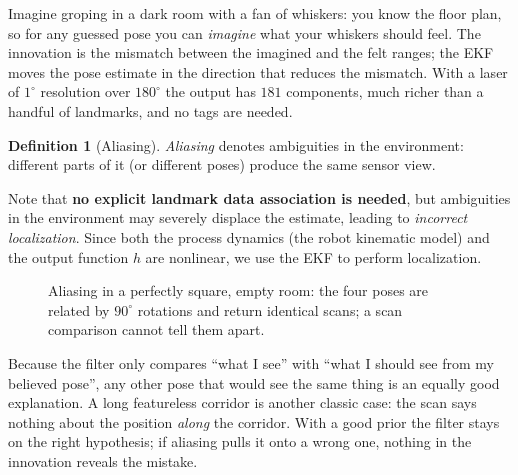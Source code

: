 \documentclass[11pt,a4paper]{article}
\def\bm#1{#1}%
\newcommand{\robot}[3][fill=white]{\begin{scope}[shift={(#2)},rotate=#3]\draw[#1,thick] (0.24,0)--(-0.16,0.15)--(-0.16,-0.15)--cycle;\end{scope}}
\theoremstyle{definition}
\newtheorem{definition}{Definition}[section]
\theoremstyle{plain}
\theoremstyle{remark}
\begin{document}
\begin{intuition}
Imagine groping in a dark room with a fan of whiskers: you know the floor plan, so for any guessed pose you can \emph{imagine} what your whiskers should feel. The innovation is the mismatch between the imagined and the felt ranges; the EKF moves the pose estimate in the direction that reduces the mismatch. With a laser of $1^\circ$ resolution over $180^\circ$ the output has $181$ components, much richer than a handful of landmarks, and no tags are needed.
\end{intuition}

\begin{definition}[Aliasing]
\emph{Aliasing} denotes ambiguities in the environment: different parts of it (or different poses) produce the same sensor view.
\end{definition}

Note that \textbf{no explicit landmark data association is needed}, but ambiguities in the environment may severely displace the estimate, leading to \emph{incorrect localization}. Since both the process dynamics (the robot kinematic model) and the output function $\bm h$ are nonlinear, we use the EKF to perform localization.

\begin{figure}[H]
\centering
{}
\caption{Aliasing in a perfectly square, empty room: the four poses are related by $90^\circ$ rotations and return identical scans; a scan comparison cannot tell them apart.}
\label{fig:aliasing}
\end{figure}

\begin{intuition}
Because the filter only compares ``what I see'' with ``what I should see from my believed pose'', any other pose that would see the same thing is an equally good explanation. A long featureless corridor is another classic case: the scan says nothing about the position \emph{along} the corridor. With a good prior the filter stays on the right hypothesis; if aliasing pulls it onto a wrong one, nothing in the innovation reveals the mistake.
\end{intuition}
\end{document}
